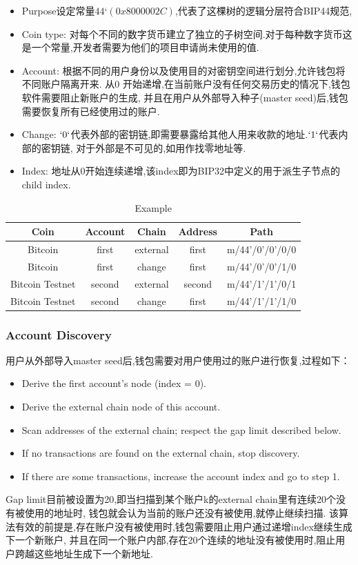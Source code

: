 \begin{itemize}
\item Purpose设定常量$44‘(0x8000002C)$,代表了这棵树的逻辑分层符合BIP44规范,
\item Coin type: 对每个不同的数字货币建立了独立的子树空间.对于每种数字货币这是一个常量,开发者需要为他们的项目申请尚未使用的值.
\item Account: 根据不同的用户身份以及使用目的对密钥空间进行划分,允许钱包将不同账户隔离开来. 
	从0 开始递增,在当前账户没有任何交易历史的情况下,钱包软件需要阻止新账户的生成,
	并且在用户从外部导入种子(master seed)后,钱包需要恢复所有已经使用过的账户.
\item Change: $`0`$代表外部的密钥链,即需要暴露给其他人用来收款的地址.$`1`$代表内部的密钥链,
	对于外部是不可见的,如用作找零地址等.
\item Index: 地址从0开始连续递增,该index即为BIP32中定义的用于派生子节点的child index.
\end{itemize}

\begin{table}
\centering
\caption{Example}
\begin{tabular}{|c|c|c|c|c|}
\hline
\small
Coin &  Account  &   Chain  &  Address &  Path \\\hline
Bitcoin &  first  &  external &  first &  m/44'/0'/0'/0/0 \\\hline
Bitcoin &  first  &  change &  first &  m/44'/0'/0'/1/0 \\\hline
Bitcoin Testnet &  second  &  external &  second &  m/44'/1'/1'/0/1\\\hline
Bitcoin Testnet &  second  &  change &  first &  m/44'/1'/1'/1/0\\\hline
\end{tabular}
\end{table}

\subsubsection{Account Discovery}
用户从外部导入master seed后,钱包需要对用户使用过的账户进行恢复,过程如下：
\begin{itemize}
\item Derive the first account's node (index = 0).
\item Derive the external chain node of this account.
\item Scan addresses of the external chain; respect the gap limit described below.
\item If no transactions are found on the external chain, stop discovery.
\item If there are some transactions, increase the account index and go to step 1.
\end{itemize}
 Gap limit目前被设置为20,即当扫描到某个账户k的external chain里有连续20个没有被使用的地址时,
 钱包就会认为当前的账户还没有被使用,就停止继续扫描.
该算法有效的前提是,存在账户没有被使用时,钱包需要阻止用户通过递增index继续生成下一个新账户,
并且在同一个账户内部,存在20个连续的地址没有被使用时,阻止用户跨越这些地址生成下一个新地址.


